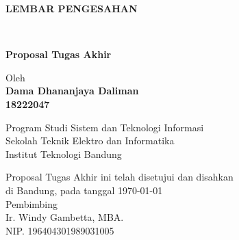 \documentclass[12pt,a4paper,oneside]{book}
\begin{document}
\newpage
\thispagestyle{empty}
\begin{center}
  \textbf{\large LEMBAR PENGESAHAN}\\[1cm]
  \vspace*{1.5cm}
    
  {\large\bfseries\uppercase{\titleVariable}}\\
     \vspace{2cm}

  {\Large \textbf{Proposal Tugas Akhir}}\\


  \vspace{1.5cm}
    
    
  {\large Oleh}\\[0.3cm]
    \textbf{
    {\large Dama Dhananjaya Daliman}\\
    {\large 18222047}
  }\\
    
  \vspace{0.5cm}
 
  {\large Program Studi Sistem dan Teknologi Informasi}\\
  {\large Sekolah Teknik Elektro dan Informatika}\\
  {\large Institut Teknologi Bandung}\\

  \vspace{1.5cm}

  Proposal Tugas Akhir ini telah disetujui dan disahkan\\ 
  di Bandung, pada tanggal \today\\[1cm]

	Pembimbing  \\[3cm]
	Ir. Windy Gambetta, MBA.   \\[0.2cm]
	NIP. 196404301989031005 

\end{center}

\vspace{1cm}
\noindent

\end{document}
